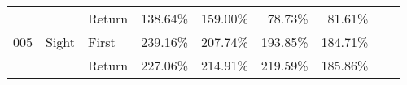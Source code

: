 \begin{table}[!htb]
\begin{tabular}{lllrrrrrr}
    &       & Return &  138.64\% &                                              159.00\% &                                                78.73\% &    81.61\% \\
005 & Sight & First &  239.16\% &                                              207.74\% &                                               193.85\% &   184.71\% \\
    &       & Return &  227.06\% &                                              214.91\% &                                               219.59\% &   185.86\% \\
\bottomrule
\end{tabular}
\end{table}

